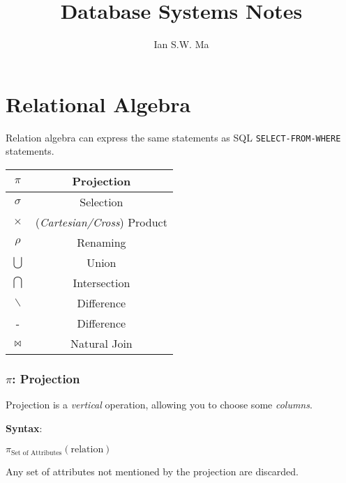 \documentclass{article}
\begin{document}
\pagestyle{headings}

\title{Database Systems Notes}
\author{Ian S.W. Ma}
\date{}
\maketitle

\section{Relational Algebra}

Relation algebra can express the same statements as SQL \texttt{SELECT-FROM-WHERE} statements.

\begin{center}
  \begin{tabular}{|c|c|}
    \hline
    $\pi$        & Projection                         \\
    \hline
    $\sigma$     & Selection                          \\
    \hline
    $\times$     & (\textit{Cartesian/Cross}) Product \\
    \hline
    $\rho$       & Renaming                           \\
    \hline
    $\bigcup$    & Union                              \\
    \hline
    $\bigcap$    & Intersection                       \\
    \hline
    $\backslash$ & Difference                         \\
    \hline
    -            & Difference                         \\
    \hline
    $\Join$      & Natural Join                       \\
    \hline
  \end{tabular}
\end{center}

\subsubsection*{$\pi$: Projection}

Projection is a \textit{vertical} operation, allowing you to choose some \textit{columns}.

\textbf{Syntax}:

$\pi_{\text{Set of Attributes}}(\text{relation})$

Any set of attributes not mentioned by the projection are discarded.
\end{document}
